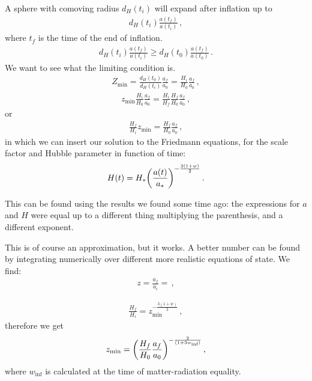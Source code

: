 \documentclass[main.tex]{subfiles}
\begin{document}
A sphere with comoving radius \(d_H (t_i)\) will expand after inflation up to 
%
\begin{align}
    d_H (t_i) \frac{a (t_f)}{a (t_i)}
    \,,
\end{align}
%
where \(t_f\) is the time of the end of inflation. 
%
\begin{align}
    d_H (t_i) \frac{a (t_f)}{a (t_i)} \geq d_H (t_0 ) \frac{a(t_f)}{a(t_0 )}
    \,.
\end{align}
%
We want to see what the limiting condition is. 
%
\begin{align}
  Z _{\text{min}} = \frac{d_H (t_0 )}{d_H (t_i)} \frac{a_f}{a_0} = \frac{H_i}{H_0 } \frac{a_f}{a_0}
\,,
\end{align}
%
%
\begin{align}
  z _{\text{min}} \frac{H_i}{H_0 } \frac{a_f}{a_0} = \frac{H_i}{H_f} \frac{H_f}{H_0 } \frac{a_f}{a_0 }
\,,
\end{align}
%
or 
%
\begin{align}
  \frac{H_f}{H_i} z _{\text{min}} = \frac{H_f}{H_0} \frac{a_f}{a_0}
\,,
\end{align}
%
in which we can insert our solution to the Friedmann equations, for the scale factor and Hubble parameter in function of time: 
%
\begin{align}
  H(t) = H_{*} \qty(\frac{a(t)}{a_{*}})^{-\frac{3(1+w)}{2}}
\,.
\end{align}

This can be found using the results we found some time ago: the expressions for \(a\) and \(H\) were equal up to a different thing multiplying the parenthesis, and a different exponent.

This is of course an approximation, but it works. A better number can be found by integrating numerically over different more realistic equations of state.
We find: 
%
\begin{align}
  z = \frac{a_f}{a_i} = 
\,,
\end{align}
%


%
\begin{align}
  \frac{H_f}{H_i} = z _{\text{min}}^{- \frac{3 (1+w)}{2}}
\,,
\end{align}
%
therefore we get 
%
\begin{align}
  z _{\text{min}} = 
  \qty(\frac{H_f}{H_0 } \frac{a_f}{a_0})^{- \frac{2}{(1+3w _{\text{inf}})}}
\,,
\end{align}
%
where \(w _{\text{inf}} \) is calculated at the time of matter-radiation equality.
\end{document}

